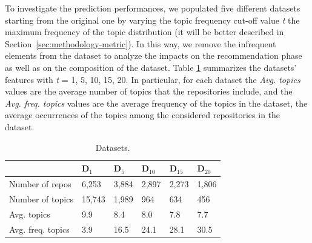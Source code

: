 To investigate the \TF prediction performances, we populated five different datasets starting from the original one by varying the topic frequency cut-off value \emph{t} \ie the maximum frequency of the topic distribution (it will be better described in Section~\ref{sec:methodology-metric}). In this way, we remove the infrequent elements from the dataset to analyze the impacts on the recommendation phase as well as on the composition of the dataset. Table \ref{tab:Datasets} summarizes the datasets' features with \emph{t} = 1, 5, 10, 15, 20. In particular, for each dataset the \emph{Avg. topics} values are the average number of topics that the repositories include, and the  \emph{Avg. freq. topics} values are the average frequency of the topics in the dataset, \ie the average occurrences of the topics among  the considered repositories in the dataset.


%


\begin{table}[h!]
	\caption{Datasets.}
	\begin{tabular}{|l|p{0.68cm}|p{0.68cm}|p{0.68cm}|p{0.68cm}|p{0.68cm}|} \hline
		 & \textbf{ D$_{1}$} & \textbf{D$_{5}$} & \textbf{ D$_{10}$} & \textbf{D$_{15}$} & \textbf{D$_{20}$} \\ \hline
		Number of repos & 6,253 & 3,884 & 2,897  & 2,273 & 1,806  \\ \hline
		Number of topics & 15,743 & 1,989 & 964 & 634 & 456 \\ \hline
		Avg. topics & 9.9 & 8.4 & 8.0  & 7.8 & 7.7 \\ \hline
		Avg. freq. topics & 3.9  & 16.5  & 24.1  & 28.1  & 30.5  \\ \hline
	\end{tabular}	
	\label{tab:Datasets}	
\end{table}



